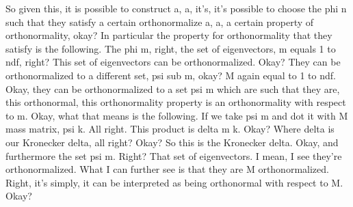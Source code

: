 \documentclass[10pt]{article}
\begin{document}
So given this, it is possible to construct a, a, it's, it's possible to choose the phi n such that they satisfy a certain orthonormalize a, a, a certain property of orthonormality, okay? In particular the property for orthonormality that they satisfy is the following. The phi m, right, the set of eigenvectors, m equals 1 to ndf, right? This set of eigenvectors can be orthonormalized. Okay? They can be orthonormalized to a different set, psi sub m, okay? M again equal to 1 to ndf. Okay, they can be orthonormalized to a set psi m which are such that they are, this orthonormal, this orthonormality property is an orthonormality with respect to m. Okay, what that means is the following. If we take psi m and dot it with M mass matrix, psi k. All right. This product is delta m k. Okay? Where delta is our Kronecker delta, all right? Okay? So this is the Kronecker delta. Okay, and furthermore the set psi m. Right? That set of eigenvectors. I mean, I see they're orthonormalized. What I can further see is that they are M orthonormalized. Right, it's simply, it can be interpreted as being orthonormal with respect to M. Okay?
\end{document}
